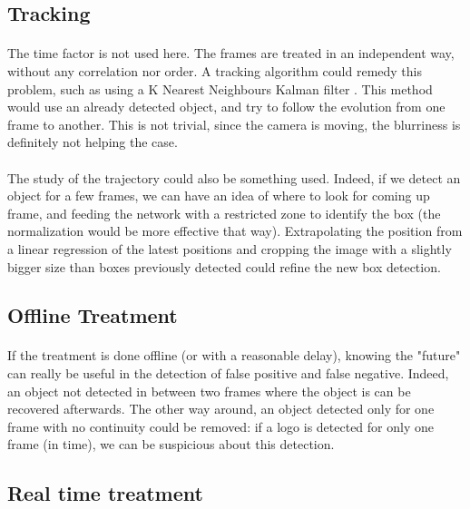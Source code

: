 \documentclass[12pt]{article}%
\begin{document}
\subsection{Tracking}

\paragraph{}
The time factor is not used here. The frames are treated in an independent way, without any correlation nor order. A tracking algorithm could remedy this problem, such as using a K Nearest Neighbours Kalman ﬁlter \cite{kalman}. This method would use an already detected object, and try to follow the evolution from one frame to another. This is not trivial, since the camera is moving, the blurriness is definitely not helping the case.

\paragraph{}
The study of the trajectory could also be something used. Indeed, if we detect an object for a few frames, we can have an idea of where to look for coming up frame, and feeding the network with a restricted zone to identify the box (the normalization would be more effective that way). Extrapolating the position from a linear regression of the latest positions and cropping the image with a slightly bigger size than boxes previously detected could refine the new box detection.

\subsection{Offline Treatment}
\paragraph{}
If the treatment is done offline (or with a reasonable delay), knowing the "future" can really be useful in the detection of false positive and false negative. Indeed, an object not detected in between two frames where the object is can be recovered afterwards. The other way around, an object detected only for one frame with no continuity could be removed: if a logo is detected for only one frame (in time), we can be suspicious about this detection.

\subsection{Real time treatment}
\end{document}
